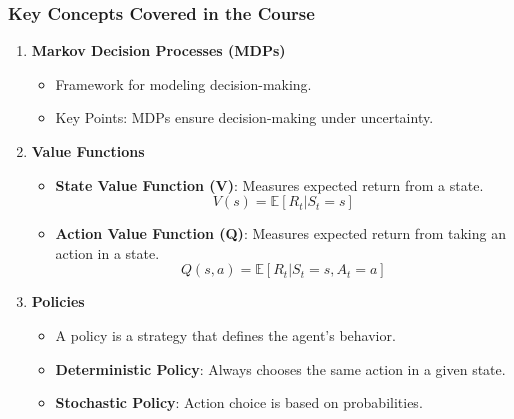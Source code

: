 \documentclass[aspectratio=169]{beamer}
\begin{document}
\begin{frame}[fragile]
    \frametitle{Key Concepts Covered in the Course}
    \begin{enumerate}
        \item \textbf{Markov Decision Processes (MDPs)}
            \begin{itemize}
                \item Framework for modeling decision-making.
                \item Key Points: MDPs ensure decision-making under uncertainty.
            \end{itemize}
        \item \textbf{Value Functions}
            \begin{itemize}
                \item \textbf{State Value Function (V)}: Measures expected return from a state.
                \[
                V(s) = \mathbb{E}[R_t | S_t = s]
                \]
                \item \textbf{Action Value Function (Q)}: Measures expected return from taking an action in a state.
                \[
                Q(s,a) = \mathbb{E}[R_t | S_t = s, A_t = a]
                \]
            \end{itemize}
        \item \textbf{Policies}
            \begin{itemize}
                \item A policy is a strategy that defines the agent's behavior.
                \item \textbf{Deterministic Policy}: Always chooses the same action in a given state.
                \item \textbf{Stochastic Policy}: Action choice is based on probabilities.
            \end{itemize}
    \end{enumerate}
\end{frame}
\end{document}
